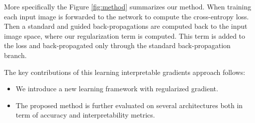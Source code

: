 More specifically the Figure \ref{fig:method} summarizes our method.
When training each input image is forwarded to the network to compute the cross-entropy loss. Then a standard and guided back-propagations are computed back to the input image space, where our regularization term is computed. This term is added to the loss and back-propagated only through the standard back-propagation branch.



The key contributions of this learning interpretable gradients approach follows:
\begin{itemize}
    \item We introduce a new learning framework with regularized gradient.
    \item The proposed method is further evaluated on several architectures both in term of accuracy and interpretability metrics.
\end{itemize}



